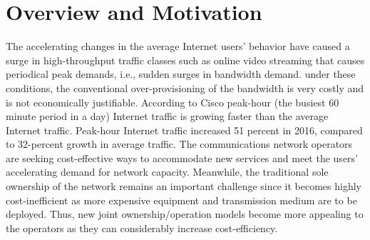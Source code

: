 

\section{Overview and Motivation}
The accelerating changes in the average Internet users' behavior have caused a surge in high-throughput traffic classes such as online video streaming that causes periodical peak demands, i.e., sudden surges in bandwidth demand. under these conditions, the conventional over-provisioning of the bandwidth is very costly and is not economically justifiable. According to Cisco \cite{cisco_2017} peak-hour (the busiest 60 minute period in a day) Internet traffic is growing faster than the average Internet traffic. Peak-hour Internet traffic increased 51 percent in 2016, compared to 32-percent growth in average traffic. 
The communications network operators are seeking cost-effective ways to accommodate new services and meet the users' accelerating demand for network capacity. Meanwhile, the traditional sole ownership of the network remains an important challenge since it becomes highly cost-inefficient as more expensive equipment and transmission medium are to be deployed. Thus, new joint ownership/operation models become more appealing to the operators as they can considerably increase cost-efficiency.

